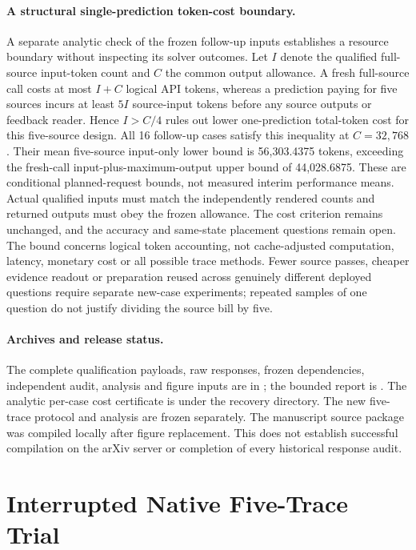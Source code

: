 \documentclass[10pt]{article}
\begin{document}
\paragraph{A structural single-prediction token-cost boundary.} A separate analytic check of the frozen follow-up inputs establishes a resource boundary without inspecting its solver outcomes. Let $I$ denote the qualified full-source input-token count and $C$ the common output allowance. A fresh full-source call costs at most $I+C$ logical API tokens, whereas a prediction paying for five sources incurs at least $5I$ source-input tokens before any source outputs or feedback reader. Hence $I>C/4$ rules out lower one-prediction total-token cost for this five-source design. All 16 follow-up cases satisfy this inequality at $C=32{,}768$. Their mean five-source input-only lower bound is 56,303.4375 tokens, exceeding the fresh-call input-plus-maximum-output upper bound of 44,028.6875. These are conditional planned-request bounds, not measured interim performance means. Actual qualified inputs must match the independently rendered counts and returned outputs must obey the frozen allowance. The cost criterion remains unchanged, and the accuracy and same-state placement questions remain open. The bound concerns logical token accounting, not cache-adjusted computation, latency, monetary cost or all possible trace methods. Fewer source passes, cheaper evidence readout or preparation reused across genuinely different deployed questions require separate new-case experiments; repeated samples of one question do not justify dividing the source bill by five.

\paragraph{Archives and release status.} The complete qualification payloads, raw responses, frozen dependencies, independent audit, analysis and figure inputs are in \protect{}; the bounded report is \protect{}. The analytic per-case cost certificate is \protect{} under the recovery directory. The new five-trace protocol and analysis are frozen separately. The manuscript source package was compiled locally after figure replacement. This does not establish successful compilation on the arXiv server or completion of every historical response audit.

\section{Interrupted Native Five-Trace Trial}
\label{app:hybrid-interrupted}
\end{document}
